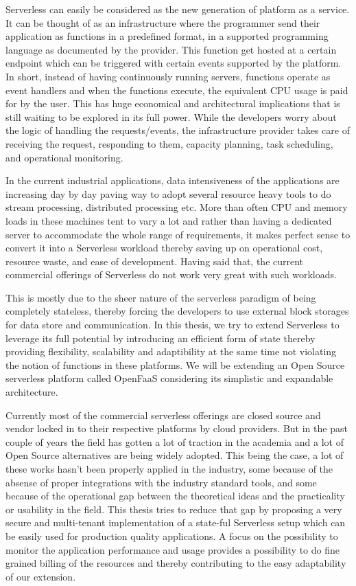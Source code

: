 \documentclass[12pt,titlepage]{article}
\begin{document}
Serverless can easily be considered as the new generation of platform as a
service. It can be thought of as an infrastructure where the programmer send
their application as functions in a predefined format, in a supported
programming language as documented by the provider. This function get hosted at
a certain endpoint which can be triggered with certain events supported by the
platform. In short, instead of having continuously running servers, functions operate as
event handlers and when the functions execute, the equivalent CPU usage is paid
for by the user. This has huge economical and architectural implications that is
still waiting to be explored in its full power. While the developers worry about
the logic of handling the requests/events, the infrastructure provider takes
care of receiving the request, responding to them, capacity planning, task
scheduling, and operational monitoring\cite{gotoconf}.

In the current industrial applications, data intensiveness of the applications are increasing
day by day paving way to adopt several resource heavy tools to do stream
processing, distributed processing etc. More than often CPU and memory loads in
these machines tent to vary a lot and rather than having a dedicated server to accommodate the whole range
of requirements, it makes perfect sense to convert it into a Serverless workload
thereby saving up on operational cost, resource waste, and ease of development.
Having said that, the current commercial offerings of Serverless do not work
very great with such workloads.

This is mostly due to the sheer
nature of the serverless paradigm of being completely stateless, thereby forcing
the developers to use external block storages for data store and communication.
In this thesis, we try to extend Serverless to leverage its full potential by
introducing an efficient form of state thereby providing flexibility, scalability and
adaptibility at the same time not violating the notion of functions in these platforms.
We will be extending an Open Source serverless platform called OpenFaaS
considering its simplistic and expandable architecture.

Currently most of the commercial serverless offerings are closed source
and vendor locked in to their respective platforms by cloud providers. But in the
past couple of years the field has gotten a lot of traction in the academia and
a lot of Open Source alternatives are being widely adopted. This being the case, a lot
of these works hasn't been properly applied in the industry, some because of
the absense of proper integrations with the industry standard tools, and some
because of the operational gap between the theoretical ideas and the
practicality or usability in the field. This thesis tries to reduce that
gap by proposing a very secure and multi-tenant implementation of a
state-ful Serverless setup which can be easily used for production quality
applications. A focus on the possibility to monitor the application performance
and usage provides a possibility to do fine grained billing of the resources and thereby
contributing to the easy adaptability of our extension.
\end{document}
